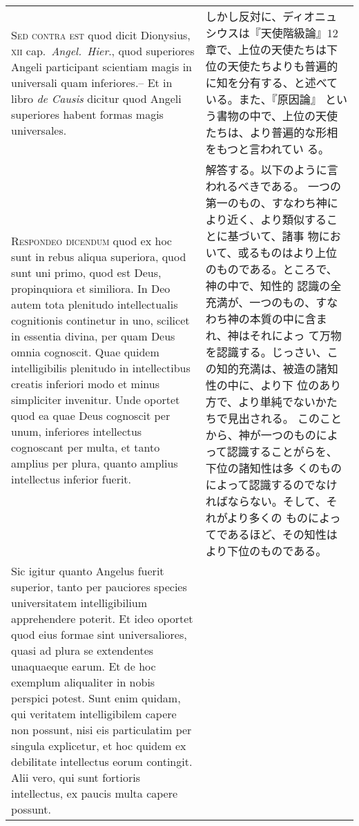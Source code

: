 \documentclass[10pt]{jsarticle} %
\begin{document}
\begin{longtable}{p{21em}p{21em}}
\\


{\scshape  Sed contra est} quod dicit Dionysius, {\scshape xii}
cap.~{\itshape Angel.~Hier}., quod superiores Angeli participant scientiam magis in
universali quam inferiores.-- Et in libro {\itshape de Causis} dicitur quod Angeli
superiores habent formas magis universales.


&

しかし反対に、ディオニュシウスは『天使階級論』12章で、上位の天使たちは下
 位の天使たちよりも普遍的に知を分有する、と述べている。また、『原因論』
 という書物の中で、上位の天使たちは、より普遍的な形相をもつと言われてい
 る。


\\


{\scshape Respondeo dicendum} quod ex hoc sunt in rebus
aliqua superiora, quod sunt uni primo, quod est Deus, propinquiora et
similiora. In Deo autem tota plenitudo intellectualis cognitionis
continetur in uno, scilicet in essentia divina, per quam Deus omnia
cognoscit. Quae quidem intelligibilis plenitudo in intellectibus creatis
inferiori modo et minus simpliciter invenitur. Unde oportet quod ea quae
Deus cognoscit per unum, inferiores intellectus cognoscant per multa, et
tanto amplius per plura, quanto amplius intellectus inferior fuerit. 


&


解答する。以下のように言われるべきである。
一つの第一のもの、すなわち神により近く、より類似することに基づいて、諸事
 物において、或るものはより上位のものである。ところで、神の中で、知性的
 認識の全充満が、一つのもの、すなわち神の本質の中に含まれ、神はそれによっ
 て万物を認識する。じっさい、この知的充満は、被造の諸知性の中に、より下
 位のあり方で、より単純でないかたちで見出される。
このことから、神が一つのものによって認識することがらを、下位の諸知性は多
 くのものによって認識するのでなければならない。そして、それがより多くの
 ものによってであるほど、その知性はより下位のものである。

\\



Sic
igitur quanto Angelus fuerit superior, tanto per pauciores species
universitatem intelligibilium apprehendere poterit. Et ideo oportet quod
eius formae sint universaliores, quasi ad plura se extendentes
unaquaeque earum. Et de hoc exemplum aliqualiter in nobis perspici
potest. Sunt enim quidam, qui veritatem intelligibilem capere non
possunt, nisi eis particulatim per singula explicetur, et hoc quidem ex
debilitate intellectus eorum contingit. Alii vero, qui sunt fortioris
intellectus, ex paucis multa capere possunt.


\end{longtable}
\end{document}
